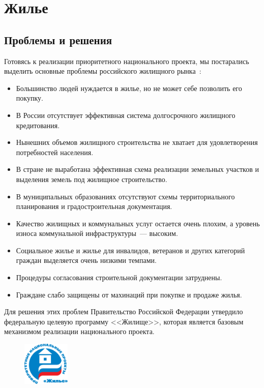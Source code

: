 \documentclass[article, 12pt, russian, oneside]{ncc}
\begin{document}
\section{Жилье}

\subsection{Проблемы и решения}

Готовясь к реализации приоритетного национального проекта, мы
постарались выделить основные проблемы российского жилищного
рынка~\cite{Hub_Problems}:

\begin{itemize}
\item Большинство людей нуждается в жилье, но не может себе позволить
  его покупку.
\item В России отсутствует эффективная система долгосрочного жилищного
  кредитования.
\item Нынешних объемов жилищного строительства не хватает для
  удовлетворения потребностей населения.
\item В стране не выработана эффективная схема реализации земельных
  участков и выделения земель под жилищное строительство.
\item В муниципальных образованиях отсутствуют схемы территориального
  планирования и градостроительная документация.
\item Качество жилищных и коммунальных услуг остается очень плохим, а
  уровень износа коммунальной инфраструктуры~--- высоким.
\item Социальное жилье и жилье для инвалидов, ветеранов и других
  категорий граждан выделяется очень низкими темпами.
\item Процедуры согласования строительной документации затруднены.
\item Граждане слабо защищены от махинаций при покупке и продаже
  жилья.
\end{itemize}

Для решения этих проблем Правительство Российской Федерации утвердило
федеральную целевую программу <<Жилище>>, которая является базовым
механизмом реализации национального проекта.

\begin{figure}
  \begin{center}
    \includegraphics[width=0.2\textwidth]{NPR_Hab}
  \end{center}
\end{figure}
\end{document}
